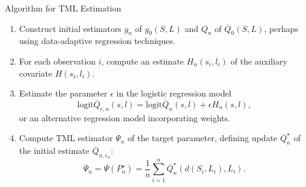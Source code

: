 \documentclass{beamer}
\begin{document}
\begin{frame}[c]{Algorithm for TML Estimation}

\begin{center}
\begin{enumerate}\label{tmle_algo}
  \itemsep6pt
  \item Construct initial estimators $g_n$ of $g_0(S, L)$ and $Q_n$ of
    $\overline{Q}_0(S, L)$, perhaps using data-adaptive regression techniques.
  \item For each observation $i$, compute an estimate $H_n(s_i, l_i)$ of the
    auxiliary covariate $H(s_i, l_i)$.
  \item Estimate the parameter $\epsilon$ in the logistic regression model
    $$\text{logit}\overline{Q}_{\epsilon, n}(s, l) =
    \text{logit}\overline{Q}_n(s, l) + \epsilon H_n(s, l),$$
    or an alternative regression model incorporating weights.
  \item Compute TML estimator $\Psi_n$ of the target parameter, defining update
    $\overline{Q}_n^{\star}$ of the initial estimate
    $\overline{Q}_{n, \epsilon_n}$:
    \begin{equation*}\label{tmle}
      \Psi_n = \Psi(P_n^{\star}) = \frac{1}{n} \sum_{i = 1}^n
        \overline{Q}_n^{\star}(d(S_i, L_i), L_i).
      \end{equation*}
\end{enumerate}
\end{center}


\end{frame}

\end{document}
